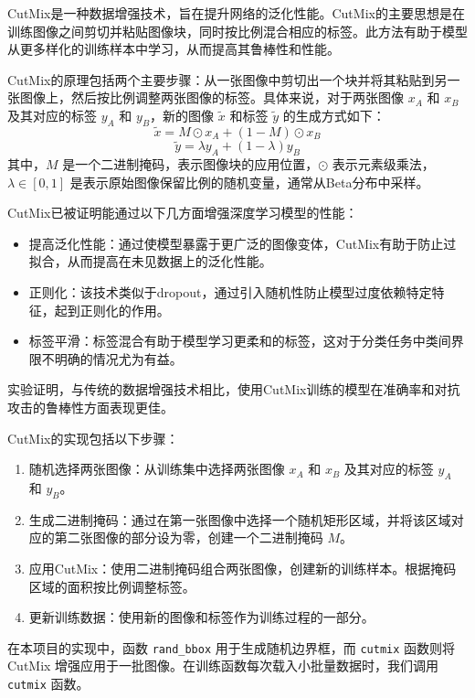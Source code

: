 \documentclass[notitlepage,cs4size,punct,oneside]{ctexrep}
\numberwithin{equation}{chapter}
\theoremstyle{mystyle}
\begin{document}
CutMix是一种数据增强技术，旨在提升网络的泛化性能。CutMix的主要思想是在训练图像之间剪切并粘贴图像块，同时按比例混合相应的标签。此方法有助于模型从更多样化的训练样本中学习，从而提高其鲁棒性和性能。

CutMix的原理包括两个主要步骤：从一张图像中剪切出一个块并将其粘贴到另一张图像上，然后按比例调整两张图像的标签。具体来说，对于两张图像 $x_A$ 和 $x_B$ 及其对应的标签 $y_A$ 和 $y_B$，新的图像 $\tilde{x}$ 和标签 $\tilde{y}$ 的生成方式如下：
\begin{equation}
\tilde{x} = M \odot x_A + (1 - M) \odot x_B
\end{equation}
\begin{equation}
\tilde{y} = \lambda y_A + (1 - \lambda) y_B
\end{equation}
其中，$M$ 是一个二进制掩码，表示图像块的应用位置，$\odot$ 表示元素级乘法，$\lambda \in [0, 1]$ 是表示原始图像保留比例的随机变量，通常从Beta分布中采样。

CutMix已被证明能通过以下几方面增强深度学习模型的性能：
\begin{itemize}
    \item 提高泛化性能：通过使模型暴露于更广泛的图像变体，CutMix有助于防止过拟合，从而提高在未见数据上的泛化性能。
    \item 正则化：该技术类似于dropout，通过引入随机性防止模型过度依赖特定特征，起到正则化的作用。
    \item 标签平滑：标签混合有助于模型学习更柔和的标签，这对于分类任务中类间界限不明确的情况尤为有益。
\end{itemize}
实验证明，与传统的数据增强技术相比，使用CutMix训练的模型在准确率和对抗攻击的鲁棒性方面表现更佳。

CutMix的实现包括以下步骤：
\begin{enumerate}
    \item 随机选择两张图像：从训练集中选择两张图像 $x_A$ 和 $x_B$ 及其对应的标签 $y_A$ 和 $y_B$。
    \item 生成二进制掩码：通过在第一张图像中选择一个随机矩形区域，并将该区域对应的第二张图像的部分设为零，创建一个二进制掩码 $M$。
    \item 应用CutMix：使用二进制掩码组合两张图像，创建新的训练样本。根据掩码区域的面积按比例调整标签。
    \item 更新训练数据：使用新的图像和标签作为训练过程的一部分。
\end{enumerate}

在本项目的实现中，函数 \texttt{rand\_bbox} 用于生成随机边界框，而 \texttt{cutmix} 函数则将 CutMix 增强应用于一批图像。在训练函数每次载入小批量数据时，我们调用\texttt{cutmix} 函数。
\end{document}
